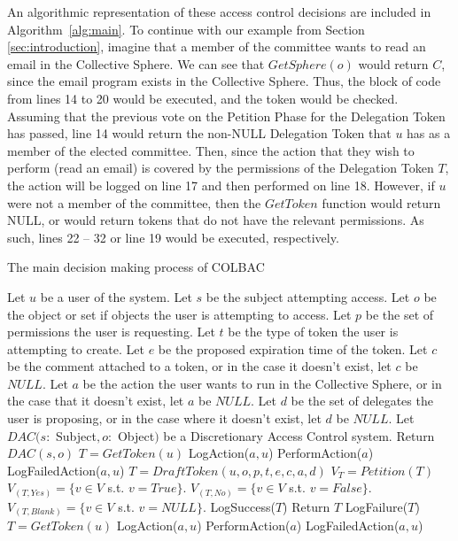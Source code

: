 An algorithmic representation of these access control decisions are included in
Algorithm~\ref{alg:main}. To continue with our example from Section
\ref{sec:introduction}, imagine that a member of the committee wants to read an
email in the Collective Sphere. We can see that $GetSphere(o)$ would return $C$,
since the email program exists in the Collective Sphere. Thus, the block of code
from lines 14 to 20 would be executed, and the token would be checked. Assuming
that the previous vote on the Petition Phase for the Delegation Token has
passed, line 14 would return the non-NULL Delegation Token that $u$ has as a
member of the elected committee. Then, since the action that they wish to
perform (read an email) is covered by the permissions of the Delegation Token
$T$, the action will be logged on line 17 and then performed on line 18.
However, if $u$ were not a member of the committee, then the $GetToken$ function
would return NULL, or would return tokens that do not have the relevant
permissions. As such, lines 22 -- 32 or line 19 would be executed, respectively.

\begin{algorithm}
\caption{The main decision making process of COLBAC}
\label{alg:main}
\begin{algorithmic}[1]
\State Let $u$ be a user of the system.
\State Let $s$ be the subject attempting access.
\State Let $o$ be the object or set if objects the user is attempting to access.
\State Let $p$ be the set of permissions the user is requesting.
\State Let $t$ be the type of token the user is attempting to create.
\State Let $e$ be the proposed expiration time of the token.
\State Let $c$ be the comment attached to a token, or in the case it doesn't exist,
let $c$ be $NULL$.
\State Let $a$ be the action the user wants to run in the Collective Sphere, or in the
case that it doesn't exist, let $a$ be $NULL$.
\State Let $d$ be the set of delegates the user is proposing, or in the case where it
doesn't exist, let $d$ be $NULL$.
\State Let $DAC(s :$ Subject$, o:$ Object$)$ be a Discretionary Access Control
system.
    \State Return $DAC(s,o)$
    \State $T = GetToken(u)$
            \State LogAction($a, u$)
            \State PerformAction($a$)
        \Else
            \State LogFailedAction($a, u$)
        \EndIf
    \Else
        \State $T = DraftToken(u,o,p,t,e,c,a,d)$
            \State $V_{T} = Petition(T)$
            \State $V_{(T, Yes)} = \{v \in V$ s.t. $v = True\}.$
            \State $V_{(T, No)} = \{v \in V$ s.t. $v = False\}.$
            \State $V_{(T, Blank)} = \{v \in V$ s.t. $v = NULL\}$.
                \State LogSuccess($T$)
                \State Return $T$
            \Else
                \State LogFailure($T$)
            \EndIf
        \EndIf
    \EndIf
\Else
    \State $T = GetToken(u)$
        \State LogAction($a, u$)
        \State PerformAction($a$)
    \Else
        \State LogFailedAction($a, u$)
    \EndIf
\EndIf
\end{algorithmic}
\end{algorithm}

